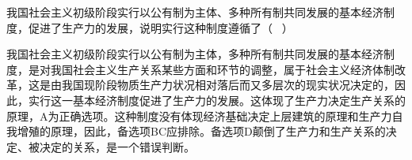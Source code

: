 \question 我国社会主义初级阶段实行以公有制为主体、多种所有制共同发展的基本经济制度，促进了生产力的发展，说明实行这种制度遵循了（
~）
\par{}
\begin{solution}我国社会主义初级阶段实行以公有制为主体，多种所有制共同发展的基本经济制度，是对我国社会主义生产关系某些方面和环节的调整，属于社会主义经济体制改革，这是由我国现阶段物质生产力状况相对落后而又多层次的现实状况决定的，因此，实行这一基本经济制度促进了生产力的发展。这体现了生产力决定生产关系的原理，A为正确选项。这种制度没有体现经济基础决定上层建筑的原理和生产力自我增殖的原理，因此，备选项BC应排除。备选项D颠倒了生产力和生产关系的决定、被决定的关系，是一个错误判断。
\end{solution}
